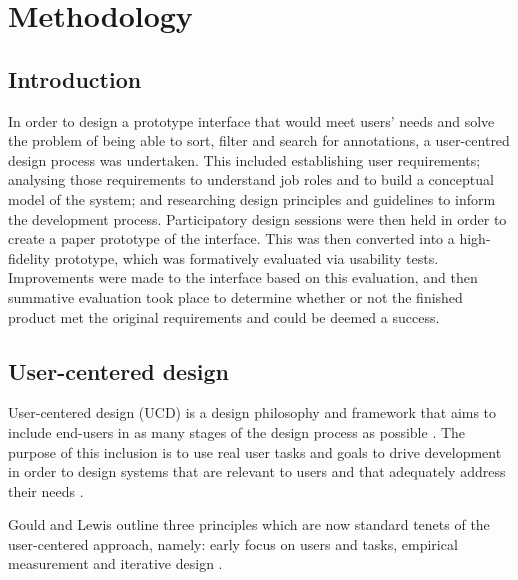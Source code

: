 
\chapter{Methodology} %

\label{Methodology} %


\section{Introduction}
In order to design a prototype interface that would meet users' needs and solve the problem of being able to sort, filter and search for annotations, a user-centred design process was undertaken. This included establishing user requirements; analysing those requirements to understand job roles and to build a conceptual model of the system; and researching design principles and guidelines to inform the development process. Participatory design sessions were then held in order to create a paper prototype of the interface. This was then converted into a high-fidelity prototype, which was formatively evaluated via usability tests. Improvements were made to the interface based on this evaluation, and then summative evaluation took place to determine whether or not the finished product met the original requirements and could be deemed a success. 

\section{User-centered design}
User-centered design (UCD) is a design philosophy and framework that aims to include end-users in as many stages of the design process as possible \citep{Abras}. The purpose of this inclusion is to use real user tasks and goals to drive development in order to design systems that are relevant to users and that adequately address their needs \citep[p. 327]{RogersPreece}.

Gould and Lewis \citep{GouldLewis} outline three principles which are now standard tenets of the user-centered approach, namely: early focus on users and tasks, empirical measurement and iterative design \citep[p. 327]{RogersPreece}.

